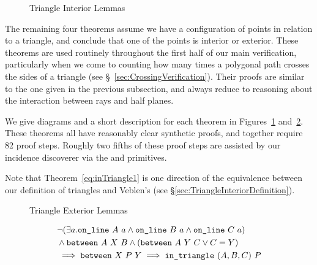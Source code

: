 \begin{figure}
\centering
{}
\qquad{}
\caption{Triangle Interior Lemmas}
\label{fig:inTriangleTheorems}
\end{figure}

The remaining four theorems assume we have a configuration of points in relation to a triangle, and conclude that one of the points is interior or exterior. These theorems are used routinely throughout the first half of our main verification, particularly when we come to counting how many times a polygonal path crosses the sides of a triangle (see \S~\ref{sec:CrossingVerification}). Their proofs are similar to the one given in the previous subsection, and always reduce to reasoning about the interaction between rays and half planes.

We give diagrams and a short description for each theorem in Figures~\ref{fig:inTriangleTheorems} and~\ref{fig:outTriangleTheorems}. These theorems all have reasonably clear synthetic proofs, and together require 82 proof steps. Roughly two fifths of these proof steps are assisted by our incidence discoverer via the  and  primitives.

Note that Theorem~\ref{eq:inTriangle1} is one direction of the equivalence between our definition of triangles and Veblen's (see \S\ref{sec:TriangleInteriorDefinition}).

\begin{figure}
\centering{}
\qquad{}
\caption{Triangle Exterior Lemmas}
\label{fig:outTriangleTheorems}
\end{figure}

\begin{equation}\label{eq:inTriangle1}
  \begin{split}
    &\neg(\exists a.\texttt{on\_line}\ A\ a\wedge \texttt{on\_line}\ B\ a\wedge \texttt{on\_line}\ C\ a)\\
    &\wedge \texttt{between}\ A\ X\ B \wedge (\texttt{between}\ A\ Y\ C \vee C = Y)\\
    &\implies \texttt{between}\ X\ P\ Y \implies \texttt{in\_triangle}\ (A,B,C)\ P
  \end{split}
\end{equation}

